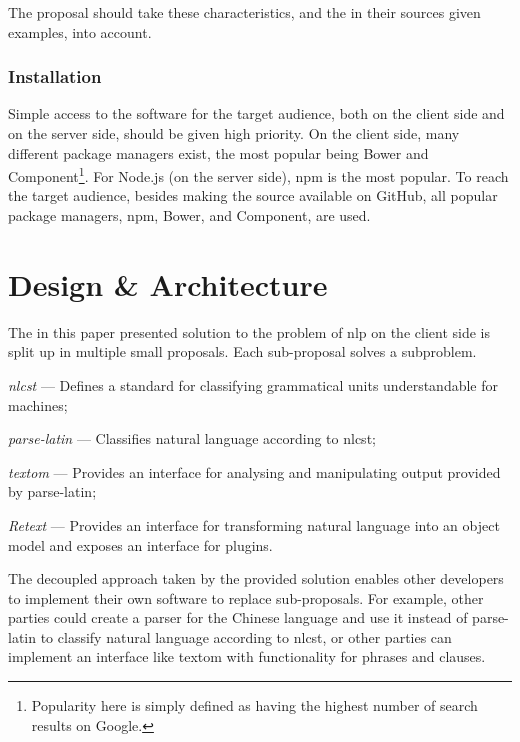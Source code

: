 The proposal should take these characteristics, and the in their sources
  given examples, into account.

\subsection{Installation}\label{installation}

Simple access to the software for the target audience, both on the client
  side and on the server side, should be given high priority.
On the client side, many different package managers exist, the most
  popular being Bower and Component\footnote{Popularity here is simply
    defined as having the highest number of search results on Google.}.
For Node.js (on the server side), \gls{npm} is the most popular.
To reach the target audience, besides making the source available on GitHub,
  all popular package managers, \gls{npm}, Bower, and Component, are used.

\chapter{Design \& Architecture}\label{design}

The in this paper presented solution to the problem of \gls{nlp} on the
client side is split up in multiple small proposals. Each sub-proposal
solves a subproblem.

\begin{aenumerate}
\item\emph{\acrshort{nlcst}} --- Defines a standard for classifying
  grammatical units understandable for machines;
\item\emph{parse-latin} --- Classifies natural language according to
  \gls{nlcst};
\item\emph{\gls{textom}} --- Provides an interface for analysing and
  manipulating output provided by parse-latin;
\item\emph{Retext} --- Provides an interface for transforming natural
  language into an object model and exposes an interface for plugins.
\end{aenumerate}

The decoupled approach taken by the provided solution enables other
  developers to implement their own software to replace sub-proposals.
For example, other parties could create a parser for the Chinese language and
  use it instead of parse-latin to classify natural language according to
  \gls{nlcst}, or other parties can implement an interface like \gls{textom}
  with functionality for phrases and clauses.

